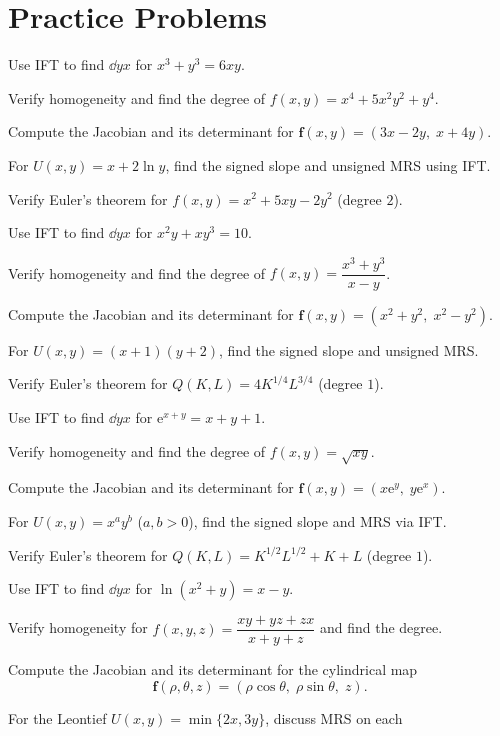 \section{Practice Problems}

\begin{problems}
  \item Use IFT to find $\dd{y}{x}$ for $x^{3}+y^{3}=6xy$.
  \item Verify homogeneity and find the degree of
        $f(x,y)=x^{4}+5x^{2}y^{2}+y^{4}$.
  \item Compute the Jacobian and its determinant for
        $\mathbf{f}(x,y)=(3x-2y,\;x+4y)$.
  \item For $U(x,y)=x+2\ln y$, find the signed slope and unsigned MRS
        using IFT.
  \item Verify Euler's theorem for $f(x,y)=x^{2}+5xy-2y^{2}$ (degree $2$).
  \item Use IFT to find $\dd{y}{x}$ for $x^{2}y+xy^{3}=10$.
  \item Verify homogeneity and find the degree of
        $f(x,y)=\dfrac{x^{3}+y^{3}}{x-y}$.
  \item Compute the Jacobian and its determinant for
        $\mathbf{f}(x,y)=(x^{2}+y^{2},\;x^{2}-y^{2})$.
  \item For $U(x,y)=(x+1)(y+2)$, find the signed slope and unsigned MRS.
  \item Verify Euler's theorem for $Q(K,L)=4K^{1/4}L^{3/4}$ (degree $1$).
  \item Use IFT to find $\dd{y}{x}$ for $\mathrm{e}^{x+y}=x+y+1$.
  \item Verify homogeneity and find the degree of $f(x,y)=\sqrt{xy}$.
  \item Compute the Jacobian and its determinant for
        $\mathbf{f}(x,y)=(x\mathrm{e}^{y},\;y\mathrm{e}^{x})$.
  \item For $U(x,y)=x^{a}y^{b}$ ($a,b>0$), find the signed slope and MRS
        via IFT.
  \item Verify Euler's theorem for $Q(K,L)=K^{1/2}L^{1/2}+K+L$
        (degree $1$).
  \item Use IFT to find $\dd{y}{x}$ for $\ln(x^{2}+y)=x-y$.
  \item Verify homogeneity for
        $f(x,y,z)=\dfrac{xy+yz+zx}{x+y+z}$ and find the degree.
  \item Compute the Jacobian and its determinant for the cylindrical map
        \[
          \mathbf{f}(\rho,\theta,z)=(\rho\cos\theta,\;\rho\sin\theta,\;z).
        \]
  \item For the Leontief $U(x,y)=\min\{2x,3y\}$, discuss MRS on each

\end{problems}
